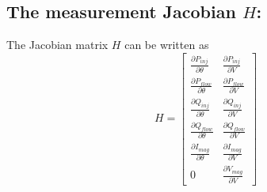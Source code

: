 \documentclass[12pt]{article}
\begin{document}
\subsection*{The measurement Jacobian $H$:}

The Jacobian matrix $H$ can be written as
\begin{equation}
H  =\begin{bmatrix}
\frac{\partial P_{inj}}{\partial \theta} & \frac{\partial P_{inj}}{\partial V}\\ 
\frac{\partial P_{flow}}{\partial \theta} & \frac{\partial P_{flow}}{\partial V}\\ 
\frac{\partial Q_{inj}}{\partial \theta} & \frac{\partial Q_{inj}}{\partial V}\\ 
\frac{\partial Q_{flow}}{\partial \theta} & \frac{\partial Q_{flow}}{\partial V}\\ 
\frac{\partial I_{mag}}{\partial \theta} & \frac{\partial I_{mag}}{\partial V}\\ 
0 & \frac{\partial V_{mag}}{\partial V}
\end{bmatrix}
\end{equation}
\end{document}
